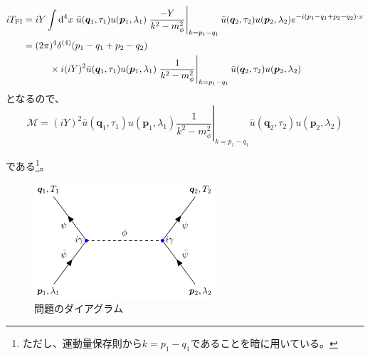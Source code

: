 \documentclass[unicode,a4paper,10pt]{ltjsarticle}
\begin{document}
\begin{enumerate}
\begin{graybox}
          \vspace*{-10pt}

          \begin{align}
            iT_{\textrm{FI}}
             & =
            iY
            \int\dd^4 x\
            \bar{u}(\bm{q}_{1},\tau_{1})u(\bm{p}_{1},\lambda_{1})
            \left.\dfrac{-Y}{k^2-m_{\phi}^2}\right|_{k=p_{1}-q_{1}}
            \bar{u}(\bm{q}_{2},\tau_{2})u(\bm{p}_{2},\lambda_{2})
            e^{-i(p_{1}-q_{1}+p_{2}-q_{2})\cdot x}
            \nonumber
            \\
             & =
            (2\pi)^4\delta^{(4)}(p_{1}-q_{1}+p_{2}-q_{2})
            \nonumber
            \\
             & \hspace*{1cm}
            \times
            i(iY)^2
            \bar{u}(\bm{q}_{1},\tau_{1})u(\bm{p}_{1},\lambda_{1})
            \left.\dfrac{1}{k^2-m_{\phi}^2}\right|_{k=p_{1}-q_{1}}
            \bar{u}(\bm{q}_{2},\tau_{2})u(\bm{p}_{2},\lambda_{2})
          \end{align}
          となるので、
          \begin{equation}
            \mathcal{M}
            =
            (iY)^2
            \bar{u}(\bm{q}_{1},\tau_{1})u(\bm{p}_{1},\lambda_{1})
            \left.\dfrac{1}{k^2-m_{\phi}^2}\right|_{k=p_{1}-q_{1}}
            \bar{u}(\bm{q}_{2},\tau_{2})u(\bm{p}_{2},\lambda_{2})
            \label{eqn:invmatrix}
          \end{equation}
        \end{graybox}
        である\footnote{
        ただし、運動量保存則から$k=p_{1}-q_{1}$であることを暗に用いている。
        }。

        \begin{figure}[ht]
          \centering
          \includegraphics[width=0.6\textwidth]{fig/fig01.pdf}
          \caption{問題のダイアグラム}
          \label{fig:feynman_diag01}
        \end{figure}



\end{enumerate}
\end{document}
